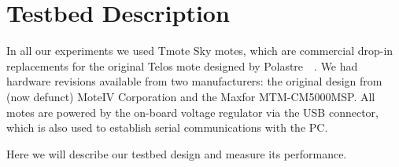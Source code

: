 \chapter{Testbed Description}

In all our experiments we used Tmote Sky motes, which are commercial drop-in replacements for the original Telos mote designed by Polastre~\etal~\cite{Polastre2005}.
We had hardware revisions available from two manufacturers: the original design from (now defunct) MoteIV Corporation and the Maxfor MTM-CM5000MSP.
All motes are powered by the on-board voltage regulator via the USB connector, which is also used to establish serial communications with the PC.

Here we will describe our testbed design and measure its performance. 






